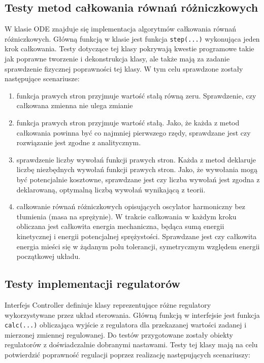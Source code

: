 \subsection{Testy metod całkowania równań różniczkowych}

W klasie ODE znajduje się implementacja algorytmów całkowania równań różniczkowych. Główną funkcją w klasie jest funkcja \texttt{step(...)} wykonująca jeden krok całkowania. Testy dotyczące tej klasy pokrywają kwestie programowe takie jak poprawne tworzenie i dekonstrukcja klasy, ale także mają za zadanie sprawdzenie fizycznej poprawności tej klasy. W tym celu sprawdzone zostały następujące scenariusze:

\begin{enumerate}
\item funkcja prawych stron przyjmuje wartość stałą równą zeru. Sprawdzenie, czy całkowana zmienna nie ulega zmianie
\item funkcja prawych stron przyjmuje wartość stałą. Jako, że każda z metod całkowania powinna być co najmniej pierwszego rzędy, sprawdzane jest czy rozwiązanie jest zgodne z analitycznym.
\item sprawdzenie liczby wywołań funkcji prawych stron. Każda z metod deklaruje liczbę niezbędnych wywołań funkcji prawych stron. Jako, że wywołania mogą być potencjalnie kosztowne, sprawdzane jest czy liczba wywołań jest zgodna z deklarowaną, optymalną liczbą wywołań wynikającą z teorii.
\item całkowanie równań różniczkowych opisujących oscylator harmoniczny bez tłumienia (masa na sprężynie). W trakcie całkowania w każdym kroku obliczana jest całkowita energia mechaniczna, będąca sumą energii kinetycznej i energii potencjalnej sprężystości. Sprawdzane jest czy całkowita energia mieści się w żądanym polu tolerancji, symetrycznym względem energii początkowej układu.
\end{enumerate}
 
\subsection{Testy implementacji regulatorów}

Interfejs Controller definiuje klasy reprezentujące różne regulatory wykorzystywane przez układ sterowania. Główną funkcją w interfejsie jest funkcja \texttt{calc(...)} obliczająca wyjście z regulatora dla przekazanej wartości zadanej i mierzonej zmiennej regulowanej. Do testów przygotowane zostały obiekty regulatorów z doświadczalnie dobranymi nastawami. Testy tej klasy mają na celu potwierdzić poprawność regulacji poprzez realizację następujących scenariuszy:


